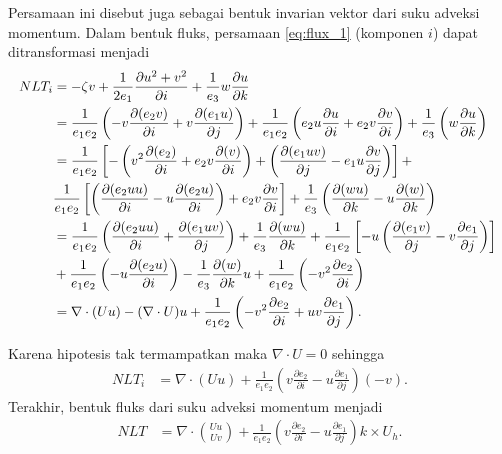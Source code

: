 \begin{spacing}{1.5}
	Persamaan ini disebut juga sebagai bentuk invarian vektor dari suku adveksi momentum. Dalam bentuk fluks, persamaan \ref{eq:flux_1} (komponen $i$) dapat ditransformasi menjadi
	\begin{equation*}
    		\resizebox{\textwidth}{!}{%
			$
		\begin{aligned}
			NLT_i &= -\zeta v + \frac{1}{2e_1} \frac{\partial u^2+v^2}{\partial i} + \frac{1}{e_3}w\frac{\partial u}{\partial k} \\
			&= \frac{1}{e_1 e_2}\left(-v\frac{\partial (e_2 v)}{\partial i} + v\frac{\partial (e_1 u)}{\partial j}\right) + \frac{1}{e_1 e_2}\left(e_2 u\frac{\partial u}{\partial i} + e_2 v\frac{\partial v}{\partial i}\right) + \frac{1}{e_3}\left( w\frac{\partial u}{\partial k}\right)  
			\\
			&= \frac{1}{e_1 e_2} \left[-\left(v^2\frac{\partial (e_2)}{\partial i} + e_2v\frac{\partial (v)}{\partial i}\right) + \left(\frac{\partial (e_1uv)}{\partial j} - e_1u\frac{\partial v}{\partial j}\right)\right] +  
			\\
			& \frac{1}{e_1 e_2} \left[\left(\frac{\partial (e_2uu)}{\partial i} - u\frac{\partial (e_2u)}{\partial i}\right) + e_2v\frac{\partial v}{\partial i} \right] + \frac{1}{e_3}\left(\frac{\partial (wu)}{\partial k} - u\frac{\partial (w)}{\partial k}\right) 
			\\
			&= \frac{1}{e_1e_2}\left(\frac{\partial (e_2uu)}{\partial i} + \frac{\partial (e_1uv)}{\partial j}\right)+
			\frac{1}{e_3}\frac{\partial (wu)}{\partial k}+\frac{1}{e_1e_2}\left[-u\left(\frac{\partial (e_1v)}{\partial j}-v\frac{\partial e_1}{\partial j}\right)\right] 
			\\ 
			& + \frac{1}{e_1e_2}\left(-u\frac{\partial (e_2u)}{\partial i}\right) - \frac{1}{e_3}\frac{\partial (w)}{\partial k}u + \frac{1}{e_1e_2}\left(-v^2\frac{\partial e_2}{\partial i}\right)  	
			\\
			&= \nabla \cdot (Uu)-(\nabla \cdot U)u + \frac{1}{e_1e_2}\left(-v^2\frac{\partial e_2}{\partial i}+uv\frac{\partial e_1}{\partial j}\right).%
		\end{aligned}
				$
		}
	\end{equation*}
	
	Karena hipotesis tak termampatkan maka $\nabla \cdot U = 0$ sehingga
	\begin{equation}
		\begin{aligned}
			NLT_i &= \nabla \cdot (Uu) +  \frac{1}{e_1e_2}\left(v\frac{\partial e_2}{\partial i}-u\frac{\partial e_1}{\partial j}\right)(-v).
		\end{aligned}
	\end{equation}
	Terakhir, bentuk fluks dari suku adveksi momentum menjadi
	\begin{equation}
		\begin{aligned}
			NLT &= \nabla \cdot \binom{Uu}{Uv} +  \frac{1}{e_1e_2}\left(v\frac{\partial e_2}{\partial i}-u\frac{\partial e_1}{\partial j}\right)k \times U_h.
		\end{aligned}
	\end{equation}


\end{spacing}
